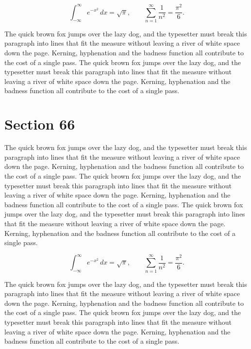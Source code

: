 \documentclass{article}
\begin{document}
\begin{equation}
\int_{-\infty}^{\infty} e^{-x^{2}}\,dx = \sqrt{\pi}, \qquad
\sum_{n=1}^{\infty} \frac{1}{n^{2}} = \frac{\pi^{2}}{6}.
\end{equation}

The quick brown fox jumps over the lazy dog, and the typesetter must break this paragraph into lines that fit the measure without leaving a river of white space down the page. Kerning, hyphenation and the badness function all contribute to the cost of a single pass. The quick brown fox jumps over the lazy dog, and the typesetter must break this paragraph into lines that fit the measure without leaving a river of white space down the page. Kerning, hyphenation and the badness function all contribute to the cost of a single pass. 
\section{Section 66}
The quick brown fox jumps over the lazy dog, and the typesetter must break this paragraph into lines that fit the measure without leaving a river of white space down the page. Kerning, hyphenation and the badness function all contribute to the cost of a single pass. The quick brown fox jumps over the lazy dog, and the typesetter must break this paragraph into lines that fit the measure without leaving a river of white space down the page. Kerning, hyphenation and the badness function all contribute to the cost of a single pass. The quick brown fox jumps over the lazy dog, and the typesetter must break this paragraph into lines that fit the measure without leaving a river of white space down the page. Kerning, hyphenation and the badness function all contribute to the cost of a single pass. 

\begin{equation}
\int_{-\infty}^{\infty} e^{-x^{2}}\,dx = \sqrt{\pi}, \qquad
\sum_{n=1}^{\infty} \frac{1}{n^{2}} = \frac{\pi^{2}}{6}.
\end{equation}

The quick brown fox jumps over the lazy dog, and the typesetter must break this paragraph into lines that fit the measure without leaving a river of white space down the page. Kerning, hyphenation and the badness function all contribute to the cost of a single pass. The quick brown fox jumps over the lazy dog, and the typesetter must break this paragraph into lines that fit the measure without leaving a river of white space down the page. Kerning, hyphenation and the badness function all contribute to the cost of a single pass. 
\end{document}
